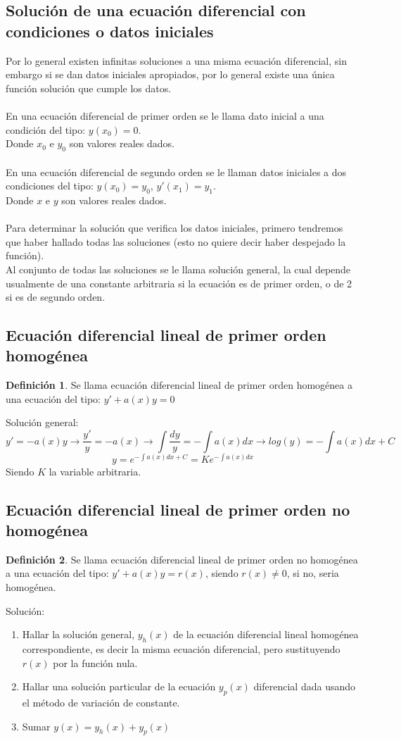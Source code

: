 \documentclass[10pt]{article}
\theoremstyle{definition}
\newtheorem{definition}{Definición}[section]
\begin{document}
\subsection{Solución de una ecuación diferencial con condiciones o datos iniciales}
Por lo general existen infinitas soluciones a una misma ecuación diferencial, sin embargo si se dan datos iniciales apropiados, por lo general existe una única función solución que cumple los datos.\\\\
En una ecuación diferencial de primer orden se le llama dato inicial a una condición del tipo: $y(x_0)=0$.\\
Donde $x_0$ e $y_0$ son valores reales dados.\\\\
En una ecuación diferencial de segundo orden se le llaman datos iniciales a dos condiciones del tipo: $y(x_0)=y_0$, $y'(x_1)=y_1$.\\
Donde $x$ e $y$ son valores reales dados.\\\\
Para determinar la solución que verifica los datos iniciales, primero tendremos que haber hallado todas las soluciones (esto no quiere decir haber despejado la función).\\
Al conjunto de todas las soluciones se le llama solución general, la cual depende usualmente de una constante arbitraria si la ecuación es de primer orden, o de 2 si es de segundo orden.
\subsection{Ecuación diferencial lineal de primer orden homogénea}
\begin{definition}
	Se llama ecuación diferencial lineal de primer orden homogénea a una ecuación del tipo: $y'+a(x)y=0$
\end{definition}
Solución general:
$$y'=-a(x)y\rightarrow \frac{y'}{y}=-a(x)\rightarrow\int\frac{dy}{y}=-\int a(x)dx\rightarrow log(y)=-\int a(x)dx+C$$$$y=e^{-\int a(x)dx+C}=Ke^{-\int a(x)dx}$$
Siendo $K$ la variable arbitraria.
\newpage \subsection{Ecuación diferencial lineal de primer orden no homogénea}
\begin{definition}
	Se llama ecuación diferencial lineal de primer orden no homogénea a una ecuación del tipo: $y'+a(x)y=r(x)$, siendo $r(x)\neq 0$, si no, seria homogénea.
\end{definition}
Solución:
\begin{enumerate}
	\item Hallar la solución general, $y_h(x)$ de la ecuación diferencial lineal homogénea correspondiente, es decir la misma ecuación diferencial, pero sustituyendo $r(x)$ por la función nula.
	\item Hallar una solución particular de la ecuación $y_p(x)$ diferencial dada usando el método de variación de constante.
	\item Sumar $y(x)=y_h(x)+y_p(x)$
\end{enumerate}
\end{document}

